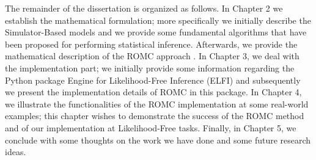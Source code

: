 The remainder of the dissertation is organized as follows. In Chapter
2 we establish the mathematical formulation; more specifically we
initially describe the Simulator-Based models and we provide some
fundamental algorithms that have been proposed for performing
statistical inference. Afterwards, we provide the mathematical
description of the ROMC approach \autocite{Ikonomov2019}. In Chapter 3, we
deal with the implementation part; we initially provide some
information regarding the Python package Engine for Likelihood-Free
Inference (ELFI) \autocite{1708.00707} and subsequently we present the
implementation details of ROMC in this package. In Chapter 4, we
illustrate the functionalities of the ROMC implementation at some
real-world examples; this chapter wishes to demonstrate the success of
the ROMC method and of our implementation at Likelihood-Free
tasks. Finally, in Chapter 5, we conclude with some thoughts on the
work we have done and some future research ideas.

